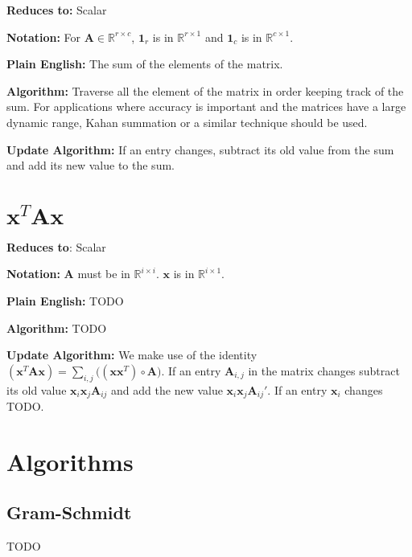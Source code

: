 \documentclass{book}
\newcommand{\mA}{\mathbf{A}}
\newcommand{\vx}{\mathbf{x}}
\begin{document}
\textbf{Reduces to:} Scalar

\textbf{Notation:} For $\mA \in \mathbb{R}^{r\times c}$, $\mathbf{1}_r$ is in $\mathbb{R}^{r \times 1}$ and $\mathbf{1}_c$ is in $\mathbb{R}^{c \times 1}$.

\textbf{Plain English:} The sum of the elements of the matrix.

\textbf{Algorithm:} Traverse all the element of the matrix in order keeping track of the sum. For applications where accuracy is important and the matrices have a large dynamic range, Kahan summation or a similar technique should be used.

\textbf{Update Algorithm:} If an entry changes, subtract its old value from the sum and add its new value to the sum.



\chapter{$\vx^T \mA \vx$}

\textbf{Reduces to}: Scalar

\textbf{Notation:} $\mA$ must be in $\mathbb{R}^{i\times i}$. $\vx$ is in $\mathbb{R}^{i \times 1}$.

\textbf{Plain English:} TODO

\textbf{Algorithm:} TODO

\textbf{Update Algorithm:} We make use of the identity $(\vx^T \mA \vx)=\sum_{i,j}\big((\vx \vx^T)\circ\mA\big)$. If an entry $\mA_{i,j}$ in the matrix changes subtract its old value $\vx_i \vx_j \mA_{ij}$ and add the new value $\vx_i \vx_j \mA_{ij}'$. If an entry $\vx_i$ changes TODO.





\chapter{Algorithms}

\section{Gram-Schmidt}
TODO
\end{document}
